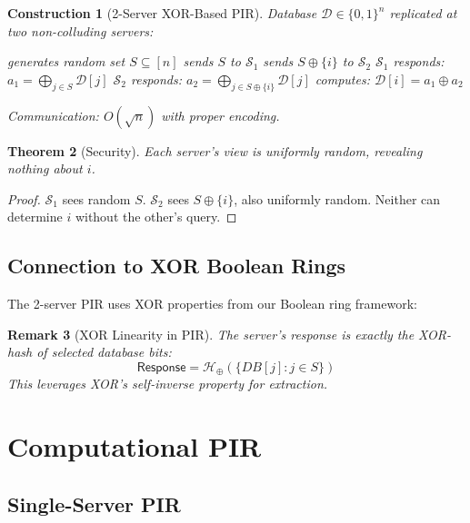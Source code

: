 \documentclass[11pt,final,hidelinks]{article}
\newcommand{\DB}{\mathcal{D}}
\newcommand{\Response}{\mathsf{Response}}
\newcommand{\Server}{\mathcal{S}}
\newcommand{\Client}{\mathcal{C}}
\newcommand{\XOR}{\oplus}
\newcommand{\HashXOR}[1]{\mathcal{H}_{\XOR}(#1)}
\newtheorem{theorem}{Theorem}[section]
\newtheorem{remark}[theorem]{Remark}
\newtheorem{construction}[theorem]{Construction}
\begin{document}
\begin{construction}[2-Server XOR-Based PIR]
Database $\DB \in \{0,1\}^n$ replicated at two non-colluding servers:
\begin{algorithm}[H]
\caption{2-Server PIR Protocol}
\KwOut{Bit $\DB[i]$}
\Client generates random set $S \subseteq [n]$\;
\Client sends $S$ to $\Server_1$\;
\Client sends $S \oplus \{i\}$ to $\Server_2$\;
$\Server_1$ responds: $a_1 = \bigoplus_{j \in S} \DB[j]$\;
$\Server_2$ responds: $a_2 = \bigoplus_{j \in S \oplus \{i\}} \DB[j]$\;
\Client computes: $\DB[i] = a_1 \oplus a_2$\;
\end{algorithm}
Communication: $O(\sqrt{n})$ with proper encoding.
\end{construction}

\begin{theorem}[Security]
Each server's view is uniformly random, revealing nothing about $i$.
\end{theorem}

\begin{proof}
$\Server_1$ sees random $S$. $\Server_2$ sees $S \oplus \{i\}$, also uniformly random.
Neither can determine $i$ without the other's query.
\end{proof}

\subsection{Connection to XOR Boolean Rings}

The 2-server PIR uses XOR properties from our Boolean ring framework:

\begin{remark}[XOR Linearity in PIR]
The server's response is exactly the XOR-hash of selected database bits:
\begin{equation}
\Response = \HashXOR{\{DB[j] : j \in S\}}
\end{equation}
This leverages XOR's self-inverse property for extraction.
\end{remark}

\section{Computational PIR}

\subsection{Single-Server PIR}
\end{document}
